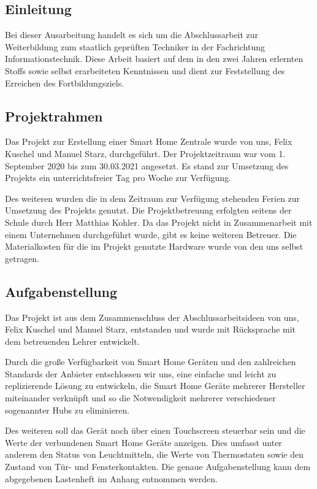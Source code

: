 \documentclass[12pt,a4paper]{article}
\begin{document}
 	\subsection{Einleitung}
 	Bei dieser Ausarbeitung handelt es sich um die Abschlussarbeit zur Weiterbildung zum staatlich geprüften Techniker in der Fachrichtung Informationstechnik. Diese Arbeit basiert auf dem in den zwei Jahren erlernten Stoffs sowie selbst erarbeiteten Kenntnissen und dient zur Feststellung des Erreichen des Fortbildungsziels.
 	\subsection{Projektrahmen}
 	Das Projekt zur Erstellung einer Smart Home Zentrale wurde von uns, Felix Kuschel und Manuel Starz, durchgeführt. Der Projektzeitraum war vom 1. September 2020 bis zum 30.03.2021 angesetzt. Es stand zur Umsetzung des Projekts ein unterrichtsfreier Tag pro Woche zur Verfügung.\par
 	Des weiteren wurden die in dem Zeitraum zur Verfügung stehenden Ferien zur Umsetzung des Projekts genutzt. Die Projektbetreuung erfolgten seitens der Schule durch Herr Matthias Kohler. Da das Projekt nicht in Zusammenarbeit mit einem Unternehmen durchgeführt wurde, gibt es keine weiteren Betreuer. Die Materialkosten für die im Projekt genutzte Hardware wurde von den uns selbst getragen.
 	\subsection{Aufgabenstellung}
 	Das Projekt ist aus dem Zusammenschluss der Abschlussarbeitsideen von uns, Felix Kuschel und Manuel Starz, entstanden und wurde mit Rücksprache mit dem betreuenden Lehrer entwickelt.\par
 	 Durch die große Verfügbarkeit von Smart Home Geräten und den zahlreichen Standards der Anbieter entschlossen wir uns, eine einfache und leicht zu replizierende Lösung zu entwickeln, die Smart Home Geräte mehrerer Hersteller miteinander verknüpft und so die Notwendigkeit mehrerer verschiedener sogenannter Hubs zu eliminieren. \par
 	Des weiteren soll das Gerät noch über einen Touchscreen steuerbar sein und die Werte der verbundenen Smart Home Geräte anzeigen. Dies umfasst unter anderem den Status von Leuchtmitteln, die Werte von Thermostaten sowie den Zustand von Tür- und Fensterkontakten. Die genaue Aufgabenstellung kann dem abgegebenen Lastenheft im Anhang entnommen werden.
\end{document}
